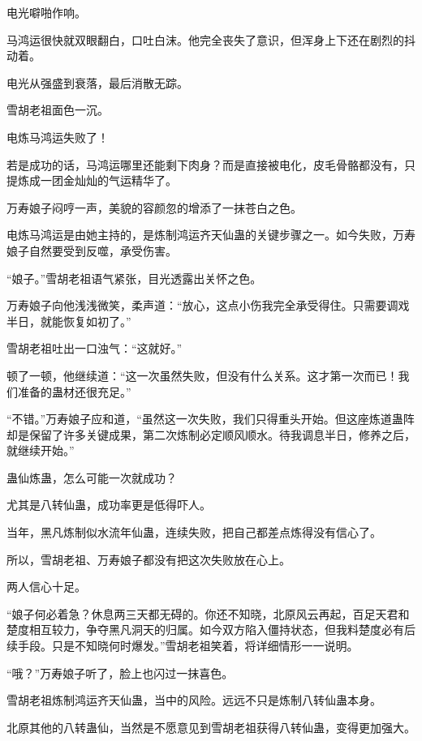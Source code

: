 
\begin{this_body}



电光噼啪作响。

马鸿运很快就双眼翻白，口吐白沫。他完全丧失了意识，但浑身上下还在剧烈的抖动着。

电光从强盛到衰落，最后消散无踪。

雪胡老祖面色一沉。

电炼马鸿运失败了！

若是成功的话，马鸿运哪里还能剩下肉身？而是直接被电化，皮毛骨骼都没有，只提炼成一团金灿灿的气运精华了。

万寿娘子闷哼一声，美貌的容颜忽的增添了一抹苍白之色。

电炼马鸿运是由她主持的，是炼制鸿运齐天仙蛊的关键步骤之一。如今失败，万寿娘子自然要受到反噬，承受伤害。

“娘子。”雪胡老祖语气紧张，目光透露出关怀之色。

万寿娘子向他浅浅微笑，柔声道：“放心，这点小伤我完全承受得住。只需要调戏半日，就能恢复如初了。”

雪胡老祖吐出一口浊气：“这就好。”

顿了一顿，他继续道：“这一次虽然失败，但没有什么关系。这才第一次而已！我们准备的蛊材还很充足。”

“不错。”万寿娘子应和道，“虽然这一次失败，我们只得重头开始。但这座炼道蛊阵却是保留了许多关键成果，第二次炼制必定顺风顺水。待我调息半日，修养之后，就继续开始。”

蛊仙炼蛊，怎么可能一次就成功？

尤其是八转仙蛊，成功率更是低得吓人。

当年，黑凡炼制似水流年仙蛊，连续失败，把自己都差点炼得没有信心了。

所以，雪胡老祖、万寿娘子都没有把这次失败放在心上。

两人信心十足。

“娘子何必着急？休息两三天都无碍的。你还不知晓，北原风云再起，百足天君和楚度相互较力，争夺黑凡洞天的归属。如今双方陷入僵持状态，但我料楚度必有后续手段。只是不知晓何时爆发。”雪胡老祖笑着，将详细情形一一说明。

“哦？”万寿娘子听了，脸上也闪过一抹喜色。

雪胡老祖炼制鸿运齐天仙蛊，当中的风险。远远不只是炼制八转仙蛊本身。

北原其他的八转蛊仙，当然是不愿意见到雪胡老祖获得八转仙蛊，变得更加强大。


\end{this_body}
